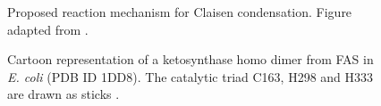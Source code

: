 			\setlength\fboxsep{5pt}
			\setlength\fboxrule{1.5pt}
			\begin{figure} []
			\centering
			\caption[Proposed reaction mechanism for Claisen condensation]{Proposed reaction mechanism for Claisen condensation. Figure adapted from \parencite{Smith2007}.}
			\label{fig:KSreact}
			\end{figure}			
						
			\setlength\fboxsep{5pt}
			\setlength\fboxrule{1.5pt}
			\begin{figure} []
			\centering
			\caption[Cartoon representation of a ketosynthase homo dimer from FAS in \textit{E. coli}]{Cartoon representation of a ketosynthase homo dimer from FAS in \textit{E. coli} (PDB ID 1DD8). The catalytic triad C163, H298 and H333 are drawn as sticks \parencite{Olsen1999}.}
			\label{fig:KS}
			\end{figure}
			
